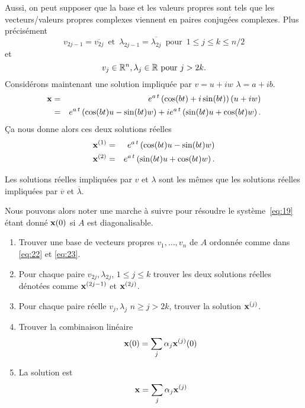 Aussi, on peut supposer que la base et les valeurs propres sont tels que les vecteurs/valeurs propres complexes viennent en paires conjugées complexes. Plus précisément
\begin{equation}
\label{eq:22}
  v_{2j-1} = \overline{v_{2j}}\, \text{ et } \, \lambda_{2j-1} = \overline{\lambda_{2j}} \, \text{ pour } \, 1 \leq j \leq k \leq n/2 
\end{equation}
et 
\begin{equation}
  \label{eq:23}  
  v_j \in \mathbb{R}^n, \lambda_j \in \mathbb{R} \text{ pour } j > 2k. 
\end{equation}
%
Considérons maintenant une solution impliquée par $v = u+iw$  $\lambda= a+ib$. 
\begin{eqnarray*}
  \mathbf{x} & = & e^{a \, t} \left(\cos (b t)  + i \sin (b t ) \right)  (u + i w)  \\
   & = & e^{a \, t} \left(\cos (b t) u - \sin (bt)w \right)  + ie^{a \, t} \left(\sin (b t ) u + \cos(bt)w \right). 
\end{eqnarray*}
Ça nous donne alors ces deux solutions réelles 
\begin{eqnarray*}
  \mathbf{x}^{(1)} & = & e^{a \, t} \left(\cos (b t) u - \sin (bt)w \right) \\
  \mathbf{x}^{(2)} & = &  e^{a \, t} \left(\sin (b t ) u + \cos(bt)w \right). 
\end{eqnarray*}
\begin{remark}
  \label{rem:2}
  Les solutions réelles impliquées par $v$ et $\lambda$ sont les mêmes que les solutions réelles impliquées par $\overline{v}$ et $\overline{\lambda}$. 
\end{remark}

Nous pouvons alors noter une marche à suivre pour résoudre le système~\eqref{eq:19} étant donné $\mathbf{x}(0)$ si $A$ est diagonalisable.
\begin{enumerate}
\item Trouver une base de vecteurs propres $v_1,\dots,v_n$ de $A$ ordonnée comme dans \eqref{eq:22} et \eqref{eq:23}. 
\item Pour chaque paire $v_{2j},\lambda_{2j}$, $1 \leq j \leq k$ trouver les  deux solutions réelles dénotées comme  $\mathbf{x}^{(2j-1)}$ et $\mathbf{x}^{(2j)}$. 
\item Pour chaque paire réelle $v_j, \lambda_j$ $n\geq j>2k$, trouver la solution $\mathbf{x}^{(j)}$. 
\item Trouver la combinaison linéaire 
  \begin{displaymath}
    \mathbf{x}(0) = \sum_{j} \alpha_j \mathbf{x}^{(j)}(0) 
  \end{displaymath}
\item La solution est 
  \begin{displaymath}
    \mathbf{x} = \sum_{j} \alpha_j \mathbf{x}^{(j)} 
  \end{displaymath}
\end{enumerate}



